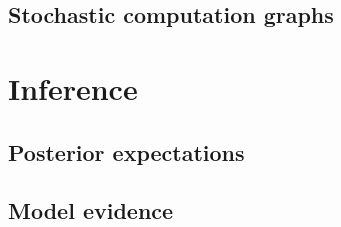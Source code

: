
\subsection{Stochastic computation graphs}


\section{Inference}


\subsection{Posterior expectations}

\subsection{Model evidence}


